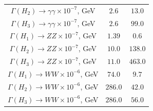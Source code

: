 \begin{table}[b!]
\begin{tabular}{c|c|c}
$\Gamma (H_2)\rightarrow \gamma \gamma \times 10^{-7}$, GeV & $2.6$ & $13.0$

\\

$\Gamma (H_3)\rightarrow \gamma \gamma \times 10^{-7}$, GeV & $2.6$ & $99.0$

\\

$\Gamma (H_1)\rightarrow Z Z \times 10^{-7}$, GeV & $1.39$ & $0.6$

\\

$\Gamma (H_2)\rightarrow Z Z \times 10^{-7}$, GeV & $10.0$ & $138.0$

\\

$\Gamma (H_3)\rightarrow Z Z \times 10^{-7}$, GeV & $11.0$ & $463.0$

\\

$\Gamma (H_1)\rightarrow W W \times 10^{-6}$, GeV & $74.0$ & $9.7$

\\

$\Gamma (H_2)\rightarrow W W \times 10^{-6}$, GeV & $286.0$ & $42.0$

\\

$\Gamma (H_3)\rightarrow W W \times 10^{-6}$, GeV & $286.0$ & $56.0$

\\
















\hline

\end{tabular}

\end{table}





